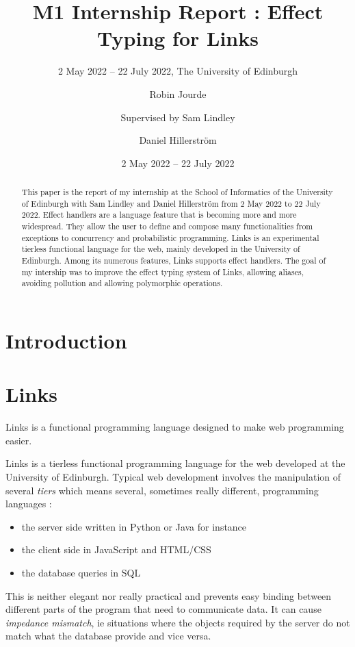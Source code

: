 \documentclass[11pt, nonacm=true, language=french, language=english]{acmart}
\author[R. Jourde]{Robin Jourde}
\affiliation{%
  \institution{École Normale Supérieure de Lyon}%
  \country{France}%
}
\author{Supervised by Sam Lindley}
\author{Daniel Hillerström}
\affiliation{%
  \institution{The University of Edinburgh}%
  \country{United Kingdom}%
}
\title[M1 Intership Report]{M1 Internship Report : Effect Typing for Links}
\subtitle{2 May 2022 -- 22 July 2022, The University of Edinburgh}
\date{2 May 2022 -- 22 July 2022}
\begin{document}
\begin{abstract}
  This paper is the report of my internship at the School of Informatics of the University of Edinburgh with Sam Lindley and Daniel Hillerström from 2 May 2022 to 22 July 2022.
  Effect handlers are a language feature that is becoming more and more widespread. They allow the user to define and compose many functionalities from exceptions to concurrency and probabilistic programming.
  Links is an experimental tierless functional language for the web, mainly developed in the University of Edinburgh. Among its numerous features, Links supports effect handlers.
  The goal of my intership was to improve the effect typing system of Links, allowing aliases, avoiding pollution and allowing polymorphic operations.
\end{abstract}


\maketitle

\tableofcontents


\section{Introduction}

\section{Links}

\begin{fquote}
 Links is a functional programming language designed to make web programming easier.
\end{fquote}

Links \cite{} is a tierless functional programming language for the web developed at the University of Edinburgh. Typical web development involves the manipulation of several \emph{tiers} which means several, sometimes really different, programming languages :
\begin{itemize}
  \item the server side written in Python or Java for instance
  \item the client side in JavaScript and HTML/CSS
  \item the database queries in SQL
\end{itemize}
This is neither elegant nor really practical and prevents easy binding between different parts of the program that need to communicate data. It can cause \emph{impedance mismatch}, ie situations where the objects required by the server do not match what the database provide and vice versa.
\end{document}
